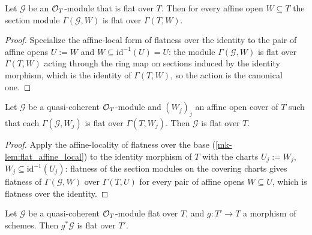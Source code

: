 \begin{lemma}
  \label{mk-lem:flat_sections_of_sheaf_flat}
  \leanok

  Let \(\mathcal G\) be an \(\mathcal{O}_T\)-module that is flat over \(T\).  Then
  for every affine open \(W \subseteq T\) the section module
  \(\Gamma(\mathcal G, W)\) is flat over \(\Gamma(T, W)\).
\end{lemma}

\begin{proof}
  \leanok
  Specialize the affine-local form of flatness over the identity to the pair
  of affine opens \(U := W\) and \(W \subseteq \mathrm{id}^{-1}(U) = U\):
  the module \(\Gamma(\mathcal G, W)\) is flat over \(\Gamma(T, W)\) acting
  through the ring map on sections induced by the identity morphism, which
  is the identity of \(\Gamma(T, W)\), so the action is the canonical one.
\end{proof}

\begin{lemma}
  \label{mk-lem:sheaf_flat_of_flat_charts}
  \leanok

  Let \(\mathcal G\) be a quasi-coherent \(\mathcal{O}_T\)-module and \((W_j)_j\) an
  affine open cover of \(T\) such that each \(\Gamma(\mathcal G, W_j)\) is
  flat over \(\Gamma(T, W_j)\).  Then \(\mathcal G\) is flat over \(T\).
\end{lemma}

\begin{proof}
  \leanok
  Apply the affine-locality of flatness over the base
  (\ref{mk-lem:flat_affine_local}) to the identity morphism of \(T\) with the
  charts \(U_j := W_j\), \(W_j \subseteq \mathrm{id}^{-1}(U_j)\): flatness
  of the section modules on the covering charts gives flatness of
  \(\Gamma(\mathcal G, W)\) over \(\Gamma(T, U)\) for every pair of affine
  opens \(W \subseteq U\), which is flatness over the identity.
\end{proof}

\begin{lemma}
  \label{mk-lem:sheaf_flat_pullback}
  \leanok

  Let \(\mathcal G\) be a quasi-coherent \(\mathcal{O}_T\)-module flat over \(T\),
  and \(g : T' \to T\) a morphism of schemes.  Then \(g^*\mathcal G\) is
  flat over \(T'\).
\end{lemma}

